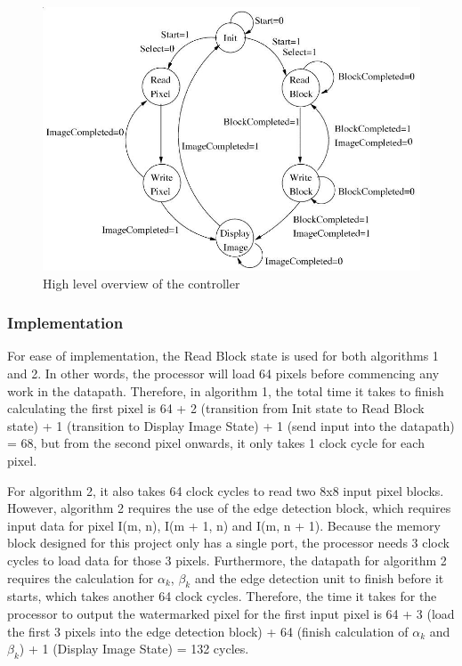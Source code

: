 \documentclass[letterpaper, 11pt]{article}
\begin{document}
	\begin{figure}[htb!]
		\centering
		\includegraphics[width=0.85\linewidth]{report_pics/fsm.jpg}
		\caption{High level overview of the controller}
		\label{fig27}
	\end{figure}
	
	\subsubsection{Implementation}
	For ease of implementation, the Read Block state is used for both algorithms 1 and 2. In other words, the processor will load 64 pixels before commencing any work in the datapath. Therefore, in algorithm 1, the total time it takes to finish calculating the first pixel is 64 + 2 (transition from Init state to Read Block state) + 1 (transition to Display Image State) + 1 (send input into the datapath) = 68, but from the second pixel onwards, it only takes 1 clock cycle for each pixel.
	
	For algorithm 2, it also takes 64 clock cycles to read two 8x8 input pixel blocks. However, algorithm 2 requires the use of the edge detection block, which requires input data for pixel I(m, n), I(m + 1, n) and I(m, n + 1). Because the memory block designed for this project only has a single port, the processor needs 3 clock cycles to load data for those 3 pixels. Furthermore, the datapath for algorithm 2 requires the calculation for $\alpha_k$, $\beta_k$ and the edge detection unit to finish before it starts, which takes another 64 clock cycles. Therefore, the time it takes for the processor to output the watermarked pixel for the first input pixel is 64 + 3 (load the first 3 pixels into the edge detection block) + 64 (finish calculation of $\alpha_k$ and $\beta_k$)  + 1 (Display Image State) = 132 cycles.
	
\end{document}
